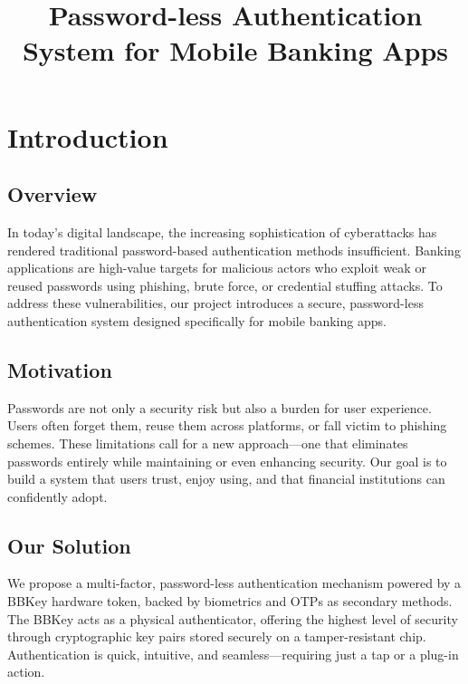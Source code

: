 \documentclass[12pt]{article}
\title{Password-less Authentication System for Mobile Banking Apps}
\author{}
\date{}
\begin{document}
\maketitle

\section*{Introduction}

\subsection*{Overview}
In today’s digital landscape, the increasing sophistication of cyberattacks has rendered traditional password-based authentication methods insufficient. Banking applications are high-value targets for malicious actors who exploit weak or reused passwords using phishing, brute force, or credential stuffing attacks. To address these vulnerabilities, our project introduces a secure, password-less authentication system designed specifically for mobile banking apps.

\subsection*{Motivation}
Passwords are not only a security risk but also a burden for user experience. Users often forget them, reuse them across platforms, or fall victim to phishing schemes. These limitations call for a new approach—one that eliminates passwords entirely while maintaining or even enhancing security. Our goal is to build a system that users trust, enjoy using, and that financial institutions can confidently adopt.

\subsection*{Our Solution}
We propose a multi-factor, password-less authentication mechanism powered by a BBKey hardware token, backed by biometrics and OTPs as secondary methods. The BBKey acts as a physical authenticator, offering the highest level of security through cryptographic key pairs stored securely on a tamper-resistant chip. Authentication is quick, intuitive, and seamless—requiring just a tap or a plug-in action.
\end{document}
